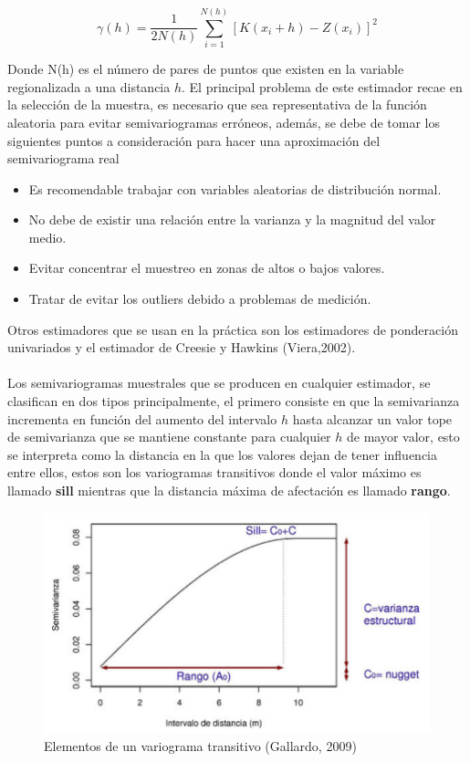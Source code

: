 \begin{equation}
\gamma(h)=\dfrac{1}{2N(h)}\sum_{i=1}^{N(h)}[K(x_{i}+h)-Z(x_{i})]^{2}
\end{equation}

Donde N(h) es el número de pares de puntos que existen en la variable regionalizada a una distancia $h$. El principal problema de este estimador recae en la selección de la muestra, es necesario que sea representativa de la función aleatoria para evitar semivariogramas erróneos, además, se debe de tomar los siguientes puntos a consideración para hacer una aproximación del semivariograma real \cite{Viera2002}

\begin{itemize}
\item Es recomendable trabajar con variables aleatorias de distribución normal. 
\item No debe de existir una relación entre la varianza y la magnitud del valor medio.
\item Evitar concentrar el muestreo en zonas de altos o bajos valores.
\item Tratar de evitar los outliers debido a problemas de medición.
\end{itemize}

Otros estimadores que se usan en la práctica son los estimadores de ponderación univariados y el estimador de Creesie y Hawkins (Viera,2002). 
\\
\\
Los semivariogramas muestrales que se producen en cualquier estimador, se clasifican en dos tipos principalmente, el primero consiste en que la semivarianza incrementa en función del aumento del intervalo $h$ hasta alcanzar un valor tope de semivarianza que se mantiene constante para cualquier $h$ de mayor valor, esto se interpreta como la distancia en la que los valores dejan de tener influencia entre ellos, estos son los variogramas transitivos donde el valor máximo es llamado \textbf{sill} mientras que la distancia máxima de afectación es llamado \textbf{rango}.

\begin{figure}[ht!]
\centering
\includegraphics[scale=0.50]{Figura7.jpeg}
\caption{Elementos de un variograma transitivo (Gallardo, 2009)}
\label{Figura6:1.6}
\end{figure}

